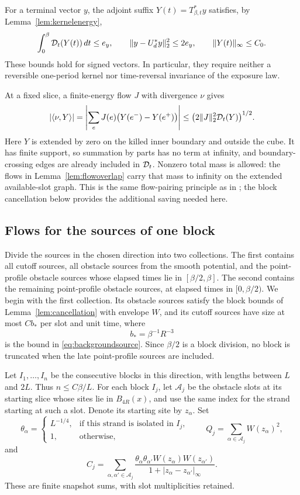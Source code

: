 For a terminal vector \(y\), the adjoint suffix
\(Y(t)=T_{\beta,t}^*y\) satisfies, by Lemma~\ref{lem:kernelenergy},
\begin{equation}\label{eq:energy-suffix}
 \int_0^\beta\mathcal D_t(Y(t))\,dt\le e_y,
 \qquad
 \lVert y-U_d^*y\rVert_2^2\le2e_y,
 \qquad
 \lVert Y(t)\rVert_\infty\le C_0.
\end{equation}
These bounds hold for signed vectors.  In particular, they require
neither a reversible one-period kernel nor time-reversal invariance of
the exposure law.

At a fixed slice, a finite-energy flow \(J\) with divergence \(\nu\)
gives
\begin{equation}\label{eq:flowpairing-energy}
 \lvert \langle \nu,Y\rangle\rvert
 =\left|\sum_eJ(e)\bigl(Y(e^-)-Y(e^+)\bigr)\right|
 \le\bigl(2\lVert J\rVert_2^2\mathcal D_t(Y)\bigr)^{1/2}.
\end{equation}
Here \(Y\) is extended by zero on the killed inner boundary and outside
the cube.  It has finite support, so summation by parts has no term at
infinity, and boundary-crossing edges are already included in
\(\mathcal D_t\).  Nonzero total mass is allowed: the flows in
Lemma~\ref{lem:flowoverlap} carry that mass to infinity on the extended
available-slot graph.  This is the same flow-pairing principle as in
\cite[Section~3.3]{BlochLaw}; the block cancellation below provides the
additional saving needed here.

\subsection{Flows for the sources of one block}

Divide the sources in the chosen direction into two collections.
The first contains all cutoff sources, all obstacle sources from the
smooth potential, and the point-profile obstacle sources whose elapsed
times lie in \([\beta/2,\beta]\).  The second contains the remaining
point-profile obstacle sources, at elapsed times in \([0,\beta/2)\).
We begin with the first collection.  Its obstacle sources satisfy the
block bounds of Lemma~\ref{lem:cancellation} with envelope \(W\),
and its cutoff sources have size at most \(Cb_*\) per slot and unit
time, where
\[
 b_*=\beta^{-1}R^{-3}
\]
is the bound in \eqref{eq:backgroundsource}.  Since \(\beta/2\) is a
block division, no block is truncated when the late point-profile
sources are included.

Let \(I_1,\ldots,I_n\) be the consecutive blocks in this direction,
with lengths between \(L\) and \(2L\).  Thus \(n\le C\beta/L\).
For each block \(I_j\), let \(\mathcal A_j\) be the obstacle slots at
its starting slice whose sites lie in \(B_{4R}(x)\), and use the same
index for the strand starting at such a slot.  Denote its starting
site by \(z_\alpha\).  Set
\[
 \theta_\alpha=
 \begin{cases}
 L^{-1/4},&\text{if this strand is isolated in }I_j,\\
 1,&\text{otherwise},
 \end{cases}
 \qquad
 Q_j=\sum_{\alpha\in\mathcal A_j}W(z_\alpha)^2,
\]
and
\[
 C_j=\sum_{\alpha,\alpha'\in\mathcal A_j}
 \frac{\theta_\alpha\theta_{\alpha'}
 W(z_\alpha)W(z_{\alpha'})}
 {1+|z_\alpha-z_{\alpha'}|_\infty}.
\]
These are finite snapshot sums, with slot multiplicities retained.

